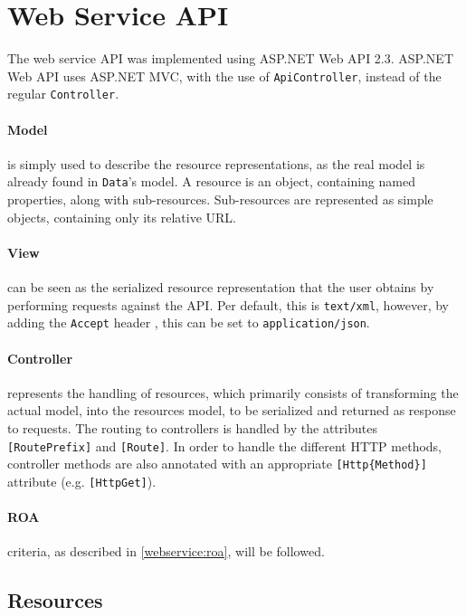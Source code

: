 \section{Web Service API}\label{design:web_service}
The web service API was implemented using ASP.NET Web API 2.3.\cite{aspnet_webapi}
ASP.NET Web API uses ASP.NET MVC\cite{aspnet_mvc}, with the use of \texttt{ApiController}, instead of the regular \texttt{Controller}.

\paragraph{Model} is simply used to describe the resource representations, as the real model is already found in \texttt{Data}'s model.
A resource is an object, containing named properties, along with sub-resources.
Sub-resources are represented as simple objects, containing only its relative URL.

\paragraph{View} can be seen as the serialized resource representation that the user obtains by performing requests against the API.
Per default, this is \texttt{text/xml}, however, by adding the \texttt{Accept} header , this can be set to \texttt{application/json}.

\paragraph{Controller} represents the handling of resources, which primarily consists of transforming the actual model, into the resources model, to be serialized and returned as response to requests.
The routing to controllers is handled by the attributes \texttt{[RoutePrefix]} and \texttt{[Route]}.
In order to handle the different HTTP methods, controller methods are also annotated with an appropriate \texttt{[Http\{Method\}]} attribute (e.g. \texttt{[HttpGet]}).

\paragraph{ROA} criteria, as described in \cref{webservice:roa}, will be followed.

\subsection{Resources}
\newcommand{\resource}[5]{\begin{description}
\item[URL:]{\texttt{#1}}
\item[Properties:]{\texttt{#2}}
\item[Resources:]{\texttt{#3}}
\item[Methods:]{\texttt{#4}}
\item[Responses:]{\texttt{#5}}
\end{description}}

